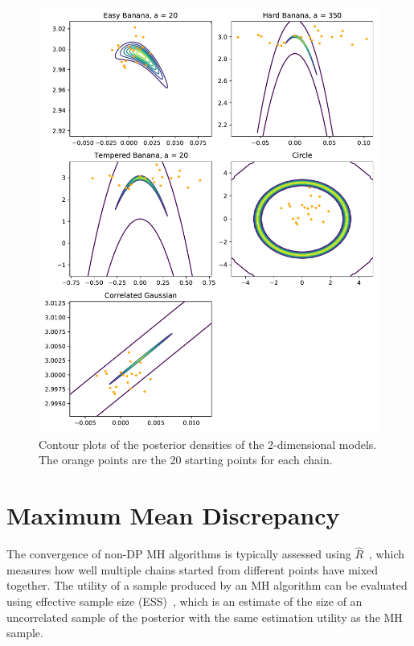 \documentclass[english,twoside,openright]{HYgraduMLDS}
\begin{document}
\begin{figure}[h]
  \centering
  \includegraphics[width=\textwidth]{figures/posterior_plots}
  \caption{
    Contour plots of the posterior densities of the 2-dimensional models.
    The orange points are the 20 starting points for each chain.
  }
  \label{posterior_plots_fig}
\end{figure}



\section{Maximum Mean Discrepancy}\label{mmd_section}

The convergence of non-DP MH algorithms is typically assessed using
\(\hat{R}\)~\cite{BDA}, which measures how well multiple chains started from 
different points have mixed together. The utility of a sample produced by an 
MH algorithm can be evaluated using effective sample size (ESS)~\cite{BDA},
which is an estimate of the size of an uncorrelated sample of the posterior
with the same estimation utility as the MH sample.
\end{document}
